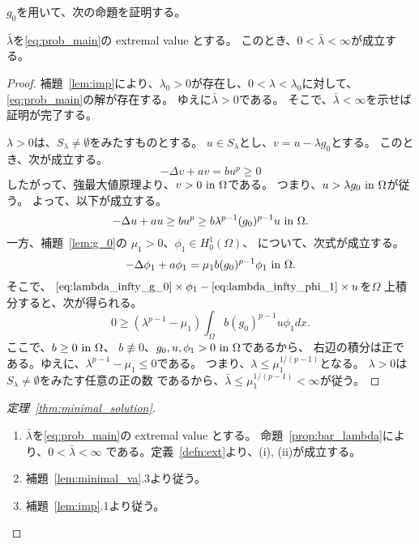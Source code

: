 $g_0$を用いて、次の命題を証明する。

\begin{prop} \label{prop:bar_lambda}
 $\bar{\lambda}$を\ref{eq:prob_main}の extremal value とする。
 このとき、$0 < \bar{\lambda} < \infty$が成立する。
\end{prop}

\begin{proof}
補題~\ref{lem:imp}により、$\lambda_0 > 0$が存在し、$0 < \lambda <
 \lambda_0$に対して、\ref{eq:prob_main}の解が存在する。
ゆえに$\bar{\lambda} > 0$である。
そこで、$\bar{\lambda} < \infty$を示せば証明が完了する。

$\lambda > 0$は、$S_\lambda \neq \emptyset$をみたすものとする。
$u \in S_\lambda$とし、$v = u - \lambda g_0$とする。
このとき、次が成立する。
\[
 -\Delta v + av = bu^p \geq 0
\]
したがって、強最大値原理より、$v > 0 ~\text{in}~ \Omega$である。
つまり、$u > \lambda g_0 ~\text{in}~ \Omega$が従う。
よって、以下が成立する。
\begin{equation}
 - \Delta u + au \geq bu^p \geq b \lambda^{p-1} (g_0)^{p-1} u ~\text{in}~
  \Omega. \label{eq:lambda_infty_g_0} 
\end{equation}
 一方、補題~\ref{lem:g_0}の
 $\mu_1 > 0$、$\phi_1 \in H_0^1(\Omega)$、
 について、次式が成立する。
\begin{equation}
 -\Delta \phi_1 + a \phi_1 = \mu_1 b (g_0)^{p-1} \phi_1 ~\text{in}~ \Omega. 
  \label{eq:lambda_infty_phi_1} 
\end{equation}
 そこで、
 $\text{\eqref{eq:lambda_infty_g_0}} \times \phi_1 - 
 \text{\eqref{eq:lambda_infty_phi_1}} \times u $を$\Omega$
 上積分すると、次が得られる。
 \[
  0 \geq (\lambda^{p-1} - \mu_1) \int_\Omega b(g_0)^{p-1} u \phi_1 dx.
 \]
 ここで、$b \geq 0 ~\text{in}~ \Omega$、
 $b \not \equiv 0$、$g_0, u, \phi_1 > 0 ~\text{in}~ \Omega$であるから、
 右辺の積分は正である。ゆえに、$\lambda^{p-1} - \mu_1 \leq 0$である。
 つまり、$\lambda \leq \mu_1^{1/(p-1)}$となる。
 $\lambda > 0$は$S_\lambda \neq \emptyset$をみたす任意の正の数
 であるから、$\bar{\lambda} \leq \mu_1 ^{1/(p-1)} < \infty$が従う。
 \qedhere
\end{proof}

\begin{proof}[定理~\ref{thm:minimal_solution}]
 \begin{enumerate}[1.] \sage
  \item $\bar{\lambda}$を\ref{eq:prob_main}の extremal value とする。
        命題~\ref{prop:bar_lambda}により、$0 < \bar{\lambda} < \infty$
        である。定義~\ref{defn:ext}より、(i), (ii)が成立する。
  \item 補題~\ref{lem:minimal_va}.3より従う。
  \item 補題~\ref{lem:imp}.1より従う。 \qedhere
 \end{enumerate}
\end{proof}

